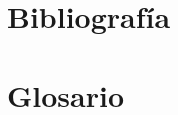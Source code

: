 \documentclass[12pt,letterpaper,spanish]{report}
\begin{document}

\newpage

\appendix 

\nocite{book}
\nocite{dura2022saas}
\nocite{pretell2024mejora}
\nocite{odooDocs}
\nocite{book}

%
%

\chapter{Bibliografía}
\renewcommand{\bibname}{}





\chapter{Glosario}

\end{document}
